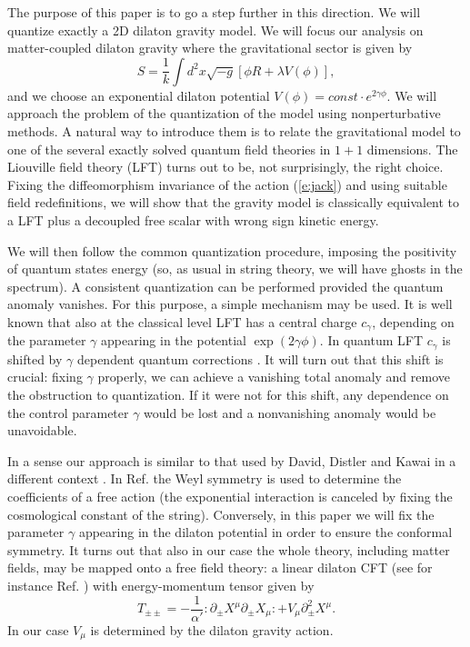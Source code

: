 \documentclass[a4paper,aps,prd,twocolumn,groupedaddress]{revtex4}
\begin{document}
The purpose of this paper is to go a step further in this direction.
We will quantize exactly a 2D dilaton gravity model.  We will focus
our analysis on matter-coupled dilaton gravity where the gravitational
sector is given by
\begin{equation}\label{e:jack}
S = \frac{1}{k}\int d^2x \sqrt{-g} \left[ \phi R + \lambda V(\phi)\right],
\end{equation}
and we choose an exponential dilaton potential $V(\phi)= const\cdot
e^{2\gamma\phi}$.  We will approach the problem of the quantization of
the model using nonperturbative methods.  A natural way to introduce
them is to relate the gravitational model to one of the several
exactly solved quantum field theories in $1+1$ dimensions. 
The Liouville field theory (LFT) turns out to be,
not surprisingly, the right choice.  Fixing the diffeomorphism
invariance of the action (\ref{e:jack}) and using suitable field
redefinitions, we will show that the gravity model is classically
equivalent to a LFT plus a decoupled free scalar with wrong sign
kinetic energy.

We will then follow the common quantization procedure, imposing the
positivity of quantum states energy (so, as usual in string theory, we
will have ghosts in the spectrum).  A consistent quantization can be
performed provided the quantum anomaly vanishes. For this purpose, a
simple mechanism may be used. It is well known that also at the
classical level LFT has a central charge $c_\gamma$, depending on the
parameter $\gamma$ appearing in the potential $\exp(2\gamma\phi)$. In
quantum LFT $c_\gamma$ is shifted by $\gamma$ dependent quantum
corrections \cite{thorn}. It will turn out that this shift is crucial:
fixing $\gamma$ properly, we can achieve a vanishing total anomaly and
remove the obstruction to quantization. If it were not for this shift,
any dependence on the control parameter $\gamma$ would be lost and 
a nonvanishing anomaly would be unavoidable.

In a sense our approach is similar to that used by David, Distler
and Kawai in a different context \cite{kawai}. In Ref.  \cite{kawai}
the Weyl symmetry is used to determine the coefficients of a free
action (the exponential interaction is canceled by fixing the
cosmological constant of the string).  Conversely, in this paper we
will fix the parameter $\gamma$ appearing in the dilaton potential in
order to ensure the conformal symmetry.  It turns out that also in our
case the whole theory, including matter fields, may be mapped onto a
free field theory: a linear dilaton CFT (see for instance Ref. 
\cite{polc}) with
energy-momentum tensor given by 
\begin{equation}\label{e:ldcft}
T_{\pm \pm} = -\frac{1}{\alpha'} :\partial_\pm X^\mu \partial_\pm X_\mu: +
V_\mu\partial_\pm^2 X^\mu.
\end{equation}
In our case $V_\mu$ is determined by the dilaton gravity action. 
\end{document}
